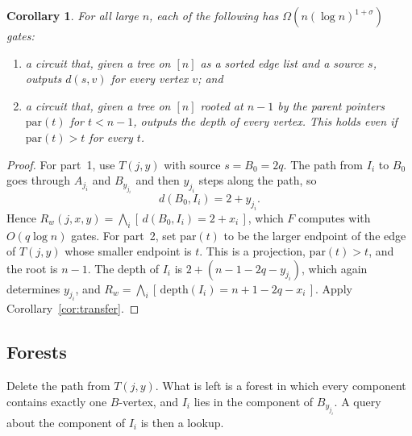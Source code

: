 \documentclass[11pt]{article}
\newtheorem{corollary}[theorem]{Corollary}
\theoremstyle{definition}
\theoremstyle{remark}
\newcommand{\ind}[1]{[\,#1\,]}
\begin{document}
\begin{corollary}\label{cor:tree}
For all large $n$, each of the following has
$\Omega(n(\log n)^{1+\sigma})$ gates:
\begin{enumerate}
\item a circuit that, given a tree on $[n]$ as a sorted edge list and a
source $s$, outputs $d(s,v)$ for every vertex $v$; and
\item a circuit that, given a tree on $[n]$ rooted at $n-1$ by the parent
pointers $\mathrm{par}(t)$ for $t<n-1$, outputs the depth of every
vertex. This holds even if $\mathrm{par}(t)>t$ for every $t$.
\end{enumerate}
\end{corollary}
\begin{proof}
For part~1, use $T(j,y)$ with source $s=B_0=2q$. The path from $I_i$ to
$B_0$ goes through $A_{j_i}$ and $B_{y_{j_i}}$ and then $y_{j_i}$ steps
along the path, so
\[
d(B_0,I_i)=2+y_{j_i}.
\]
Hence $R_w(j,x,y)=\bigwedge_i\ind{d(B_0,I_i)=2+x_i}$, which $F$ computes
with $O(q\log n)$ gates. For part~2, set $\mathrm{par}(t)$ to be the larger
endpoint of the edge of $T(j,y)$ whose smaller endpoint is $t$. This is a
projection, $\mathrm{par}(t)>t$, and the root is $n-1$. The depth of $I_i$
is $2+(n-1-2q-y_{j_i})$, which again determines $y_{j_i}$, and
$R_w=\bigwedge_i\ind{\mathrm{depth}(I_i)=n+1-2q-x_i}$. Apply
Corollary~\ref{cor:transfer}.
\end{proof}

\subsection{Forests}

Delete the path from $T(j,y)$. What is left is a forest in which every
component contains exactly one $B$-vertex, and $I_i$ lies in the
component of $B_{y_{j_i}}$. A query about the component of $I_i$ is then
a lookup.
\end{document}
